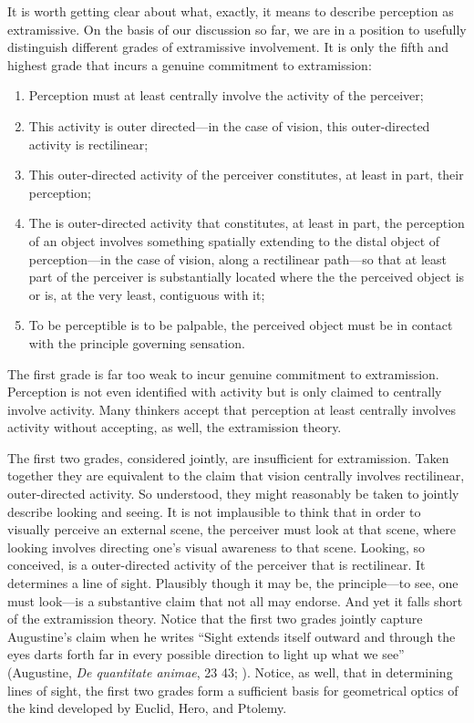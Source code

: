 \documentclass[12pt]{article}
\begin{document}
It is worth getting clear about what, exactly, it means to describe perception as extramissive. On the basis of our discussion so far, we are in a position to usefully distinguish different grades of extramissive involvement. It is only the fifth and highest grade that incurs a genuine commitment to extramission:
\begin{enumerate}
	\item Perception must at least centrally involve the activity of the perceiver;
	\item This activity is outer directed---in the case of vision, this outer-directed activity is rectilinear;
	\item This outer-directed activity of the perceiver constitutes, at least in part, their perception;
	\item The is outer-directed activity that constitutes, at least in part, the perception of an object involves something spatially extending to the distal object of perception---in the case of vision, along a rectilinear path---so that at least part of the perceiver is substantially located where the the perceived object is or is, at the very least, contiguous with it;
	\item To be perceptible is to be palpable, the perceived object must be in contact with the principle governing sensation.
\end{enumerate}

The first grade is far too weak to incur genuine commitment to extramission. Perception is not even identified with activity but is only claimed to centrally involve activity. Many thinkers accept that perception at least centrally involves activity without accepting, as well, the extramission theory. 

The first two grades, considered jointly, are insufficient for extramission. Taken together they are equivalent to the claim that vision centrally involves rectilinear, outer-directed activity. So understood, they might reasonably be taken to jointly describe looking and seeing. It is not implausible to think that in order to visually perceive an external scene, the perceiver must look at that scene, where looking involves directing one's visual awareness to that scene. Looking, so conceived, is a outer-directed activity of the perceiver that is rectilinear. It determines a line of sight. Plausibly though it may be, the principle---to see, one must look---is a substantive claim that not all may endorse. And yet it falls short of the extramission theory. Notice that the first two grades jointly capture Augustine's claim when he writes ``Sight extends itself outward and through the eyes darts forth far in every possible direction to light up what we see'' (Augustine, \emph{De quantitate animae}, 23 43; \citealt[66]{Colleran:1949ys}). Notice, as well, that in determining lines of sight, the first two grades form a sufficient basis for geometrical optics of the kind developed by Euclid, Hero, and Ptolemy. 
\end{document}
